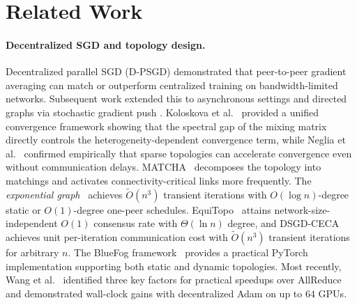 \documentclass{article}
\begin{document}
\section{Related Work}
\label{sec:related}

\paragraph{Decentralized SGD and topology design.}
Decentralized parallel SGD (D-PSGD) \cite{lian2017dpsgd} demonstrated
that peer-to-peer gradient averaging can match or outperform centralized
training on bandwidth-limited networks.  Subsequent work extended this
to asynchronous settings \cite{lian2018adpsgd} and directed graphs via
stochastic gradient push \cite{assran2019sgp}.
Koloskova et al.~\cite{koloskova2020unified} provided a unified
convergence framework showing that the spectral gap of the mixing
matrix directly controls the heterogeneity-dependent convergence term,
while Neglia et al.~\cite{neglia2020topology} confirmed empirically
that sparse topologies can accelerate convergence even without
communication delays.
MATCHA~\cite{wang2019matcha} decomposes the topology into matchings
and activates connectivity-critical links more frequently.
The \emph{exponential graph}~\cite{ying2021expgraph} achieves
$\tilde{O}(n^3)$ transient iterations with $O(\log n)$-degree static
or $O(1)$-degree one-peer schedules.
EquiTopo~\cite{jin2022equitopo} attains network-size-independent
$O(1)$ consensus rate with $\Theta(\ln n)$ degree, and
DSGD-CECA~\cite{ding2023ceca} achieves unit per-iteration
communication cost with $\tilde{O}(n^3)$ transient iterations for
arbitrary $n$.
The BlueFog framework~\cite{ying2021bluefog} provides a practical
PyTorch implementation supporting both static and dynamic topologies.
Most recently, Wang et al.~\cite{wang2025promise} identified three
key factors for practical speedups over AllReduce and demonstrated
wall-clock gains with decentralized Adam on up to 64 GPUs.
\end{document}
